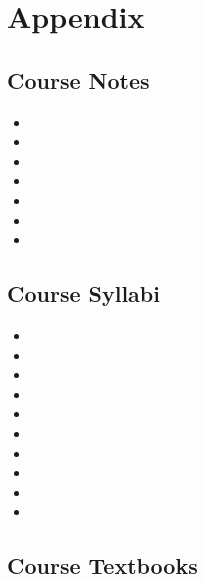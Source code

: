 \clearpage

\renewcommand{\ChapTitle}{Appendix}
\renewcommand{\SectionTitle}{Course Notes}

\chapter{\ChapTitle}
\section{\SectionTitle}

\begin{itemize}
    \item \CSPBDataStructCourseNotes
    \item \CSPBCompSysCourseNotes
    \item \CSPBLACourseNotes
    \item \CSPBDiscreteCourseNotes
    \item \CSPBDataSciCourseNotes
    \item \CSPBAlgoCourseNotes
    \item \CSPBCogSciCourseNotes
\end{itemize}

\renewcommand{\SectionTitle}{Course Syllabi}

\section{\SectionTitle}

\begin{itemize}
    \item \CSPBDataStructSyllabus
    \item \CSPBCompSysSyllabus
    \item \CSPBLASyllabus
    \item \CSPBDiscreteSyllabus
    \item \CSPBDataSciSyllabus
    \item \CSPBAlgoSyllabus
    \item \CSPBPPLSyllabus
    \item \CSPBAISyllabus
    \item \CSPBSoftDevSyllabus
    \item \CSPBCogSciSyllabus
\end{itemize}

\renewcommand{\SectionTitle}{Course Textbooks}

\vspace*{0.25em}
\section{\SectionTitle}

